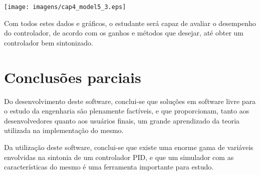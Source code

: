         \begin{center}
            \texttt{[image: imagens/cap4\_model5\_3.eps]}
        \end{center}
        
        Com todos estes dados e gráficos, o estudante será capaz de avaliar o desempenho
        do controlador, de acordo com os ganhos e métodos que desejar, até obter um
        controlador bem sintonizado.

\section{Conclusões parciais}

    Do desenvolvimento deste software, conclui-se que soluções em software livre
    para o estudo da engenharia são plenamente factíveis, e que proporcionam, tanto
    aos desenvolvedores quanto aos usuários finais, um grande aprendizado da teoria
    utilizada na implementação do mesmo.

    Da utilização deste software, conclui-se que existe uma enorme gama de variáveis
    envolvidas na sintonia de um controlador \acs{PID}, e que um simulador com as
    características do mesmo é uma ferramenta importante para estudo.
